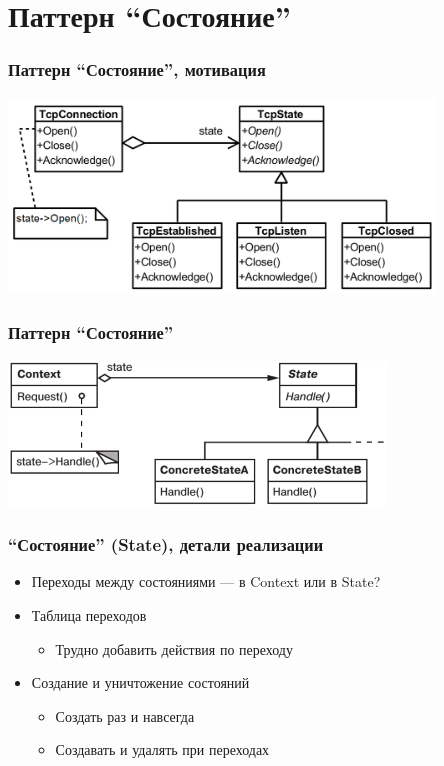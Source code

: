 \documentclass[xetex,mathserif,serif]{beamer}
\begin{document}
    \section{Паттерн ``Состояние''}

    \begin{frame}
        \frametitle{Паттерн ``Состояние'', мотивация}
        \begin{center}
            \includegraphics[width=0.85\textwidth]{stateExample.png}
        \end{center}
    \end{frame}

    \begin{frame}
        \frametitle{Паттерн ``Состояние''}
        \begin{center}
            \includegraphics[width=0.75\textwidth]{state.png}
        \end{center}
    \end{frame}

    \begin{frame}
        \frametitle{``Состояние'' (State), детали реализации}
        \begin{itemize}
            \item Переходы между состояниями --- в Context или в State?
            \item Таблица переходов
            \begin{itemize}
                \item Трудно добавить действия по переходу
            \end{itemize}
            \item Создание и уничтожение состояний
            \begin{itemize}
                \item Создать раз и навсегда
                \item Создавать и удалять при переходах
            \end{itemize}
        \end{itemize}
    \end{frame}
\end{document}
